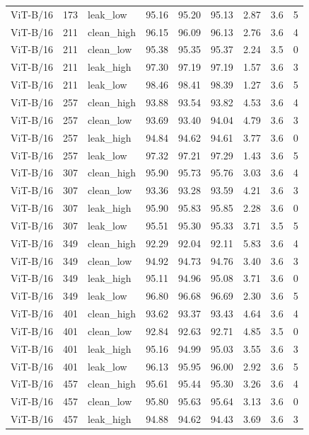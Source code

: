 {\begin{longtable}{lrlrrrrrr}
ViT-B/16 & 173 & leak\_low & 95.16 & 95.20 & 95.13 & 2.87 & 3.6 & 5 \\
ViT-B/16 & 211 & clean\_high & 96.15 & 96.09 & 96.13 & 2.76 & 3.6 & 4 \\
ViT-B/16 & 211 & clean\_low & 95.38 & 95.35 & 95.37 & 2.24 & 3.5 & 0 \\
ViT-B/16 & 211 & leak\_high & 97.30 & 97.19 & 97.19 & 1.57 & 3.6 & 3 \\
ViT-B/16 & 211 & leak\_low & 98.46 & 98.41 & 98.39 & 1.27 & 3.6 & 5 \\
ViT-B/16 & 257 & clean\_high & 93.88 & 93.54 & 93.82 & 4.53 & 3.6 & 4 \\
ViT-B/16 & 257 & clean\_low & 93.69 & 93.40 & 94.04 & 4.79 & 3.6 & 3 \\
ViT-B/16 & 257 & leak\_high & 94.84 & 94.62 & 94.61 & 3.77 & 3.6 & 0 \\
ViT-B/16 & 257 & leak\_low & 97.32 & 97.21 & 97.29 & 1.43 & 3.6 & 5 \\
ViT-B/16 & 307 & clean\_high & 95.90 & 95.73 & 95.76 & 3.03 & 3.6 & 4 \\
ViT-B/16 & 307 & clean\_low & 93.36 & 93.28 & 93.59 & 4.21 & 3.6 & 3 \\
ViT-B/16 & 307 & leak\_high & 95.90 & 95.83 & 95.85 & 2.28 & 3.6 & 0 \\
ViT-B/16 & 307 & leak\_low & 95.51 & 95.30 & 95.33 & 3.71 & 3.5 & 5 \\
ViT-B/16 & 349 & clean\_high & 92.29 & 92.04 & 92.11 & 5.83 & 3.6 & 4 \\
ViT-B/16 & 349 & clean\_low & 94.92 & 94.73 & 94.76 & 3.40 & 3.6 & 3 \\
ViT-B/16 & 349 & leak\_high & 95.11 & 94.96 & 95.08 & 3.71 & 3.6 & 0 \\
ViT-B/16 & 349 & leak\_low & 96.80 & 96.68 & 96.69 & 2.30 & 3.6 & 5 \\
ViT-B/16 & 401 & clean\_high & 93.62 & 93.37 & 93.43 & 4.64 & 3.6 & 4 \\
ViT-B/16 & 401 & clean\_low & 92.84 & 92.63 & 92.71 & 4.85 & 3.5 & 0 \\
ViT-B/16 & 401 & leak\_high & 95.16 & 94.99 & 95.03 & 3.55 & 3.6 & 3 \\
ViT-B/16 & 401 & leak\_low & 96.13 & 95.95 & 96.00 & 2.92 & 3.6 & 5 \\
ViT-B/16 & 457 & clean\_high & 95.61 & 95.44 & 95.30 & 3.26 & 3.6 & 4 \\
ViT-B/16 & 457 & clean\_low & 95.80 & 95.63 & 95.64 & 3.13 & 3.6 & 0 \\
ViT-B/16 & 457 & leak\_high & 94.88 & 94.62 & 94.43 & 3.69 & 3.6 & 3 \\

\end{longtable}}
